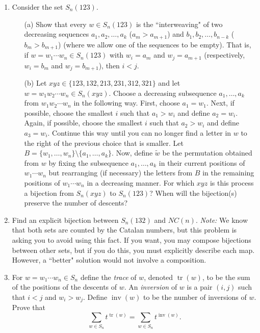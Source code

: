\documentclass[11pt]{scrartcl}
\theoremstyle{definition}
\newcommand{\tr}{\operatorname{tr}}
\newcommand{\inv}{\operatorname{inv}}
\begin{document}
\begin{enumerate}

\item Consider the set $S_n(123)$.
\begin{enumerate}
\item[(a)] Show that every $w\in S_n(123)$ is the ``interweaving" of two decreasing sequences $a_1,a_2,\ldots, a_k$ ($a_m>a_{m+1}$) and $b_1,b_2,\ldots,b_{n-k}$ ($b_m>b_{m+1}$) (where we allow one of the sequences to be empty).  That is, if $w=w_1\cdots w_n\in S_n(123)$ with $w_i=a_m$ and $w_j=a_{m+1}$ (respectively, $w_i=b_m$ and $w_j=b_{m+1}$), then $i<j$.
\item[(b)] Let $xyz\in\{123,132,213,231,312,321\}$ and let $w=w_1w_2\cdots w_n\in S_n(xyz)$.  Choose a decreasing subsequence $a_1,\ldots,a_k$ from $w_1w_2\cdots w_n$ in the following way.  First, choose $a_1=w_1$.  Next, if possible, choose the smallest $i$ such that $a_1>w_i$ and define $a_2=w_i$. Again, if possible, choose the smallest $i$ such that $a_2>w_i$ and define $a_3=w_i$.  Continue this way until you can no longer find a letter in $w$ to the right of the previous choice that is smaller.  Let $B=\{w_1,\ldots,w_n\}\setminus \{a_1,\ldots,a_k\}$.  Now, define $\widetilde{w}$ be the permutation obtained from $w$ by fixing the subsequence $a_1,\ldots, a_k$ in their current positions of $w_1\cdots w_n$ but rearranging (if necessary) the letters from $B$ in the remaining positions of $w_1\cdots w_n$ in a decreasing manner.  For which $xyz$ is this process a bijection from $S_n(xyz)$ to $S_n(123)$?  When will the bijection(s) preserve the number of descents?
\end{enumerate}

\item Find an explicit bijection between $S_n(132)$ and $NC(n)$.  \emph{Note:} We know that both sets are counted by the Catalan numbers, but this problem is asking you to avoid using this fact.  If you want, you may compose bijections between other sets, but if you do this, you must explicitly describe each map.  However, a ``better" solution would not involve a composition.

\item For $w=w_1\cdots w_n\in S_n$ define the \emph{trace} of $w$, denoted $\tr(w)$, to be the sum of the positions of the descents of $w$.  An \emph{inversion} of $w$ is a pair $(i,j)$ such that $i<j$ and $w_i>w_j$. Define $\inv(w)$ to be the number of inversions of $w$.  Prove that
\[
\sum_{w\in S_n}t^{\tr(w)}=\sum_{w\in S_n}t^{\inv(w)}.
\]


\end{enumerate}
\end{document}
